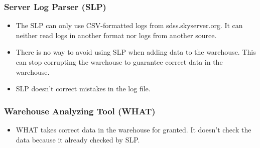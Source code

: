 \subsubsection{Server Log Parser (SLP)}
\begin{itemize}
\item The SLP can only use CSV-formatted logs from sdss.skyserver.org. 
It can neither read logs in another format nor logs
from another source.
\item There is no way to avoid using SLP when adding data to the warehouse. 
This can stop corrupting the warehouse to guarantee correct data in the warehouse.
\item SLP doesn't correct mistakes in the log file.
\end{itemize}

\subsubsection{Warehouse Analyzing Tool (WHAT)}
\begin{itemize}
\item WHAT takes correct data in the warehouse for granted. It doesn't check the
 data because it already checked by SLP. 
\end{itemize}
